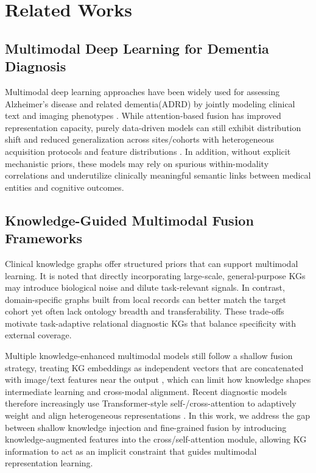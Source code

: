 \documentclass[lettersize,journal]{IEEEtran}
\begin{document}
\section{Related Works}

\subsection{Multimodal Deep Learning for Dementia Diagnosis}

    Multimodal deep learning approaches have been widely used for assessing Alzheimer's disease and related dementia(ADRD) by jointly modeling clinical text and imaging phenotypes \cite{jin2026multimodal}. While attention-based fusion has improved representation capacity, purely data-driven models can still exhibit distribution shift and reduced generalization across sites/cohorts with heterogeneous acquisition protocols and feature distributions \cite{abugabah2025intelligent}. In addition, without explicit mechanistic priors, these models may rely on spurious within-modality correlations and underutilize clinically meaningful semantic links between medical entities and cognitive outcomes.

\subsection{Knowledge-Guided Multimodal Fusion Frameworks}

    Clinical knowledge graphs offer structured priors that can support multimodal learning. It is noted that directly incorporating large-scale, general-purpose KGs may introduce biological noise and dilute task-relevant signals. In contrast, domain-specific graphs built from local records can better match the target cohort yet often lack ontology breadth and transferability. These trade-offs motivate task-adaptive relational diagnostic KGs that balance specificity with external coverage.


    Multiple knowledge-enhanced multimodal models still follow a shallow fusion strategy, treating KG embeddings as independent vectors that are concatenated with image/text features near the output \cite{chen2023knowledge}, which can limit how knowledge shapes intermediate learning and cross-modal alignment. Recent diagnostic models therefore increasingly use Transformer-style self-/cross-attention to adaptively weight and align heterogeneous representations \cite{vaswani2017attention,kyritsis2025transformerfusionad,li2024hammf,du2025vitadreview,chen2026federatedvitad}. In this work, we address the gap between shallow knowledge injection and fine-grained fusion by introducing knowledge-augmented features into the cross/self-attention module, allowing KG information to act as an implicit constraint that guides multimodal representation learning.
\end{document}
